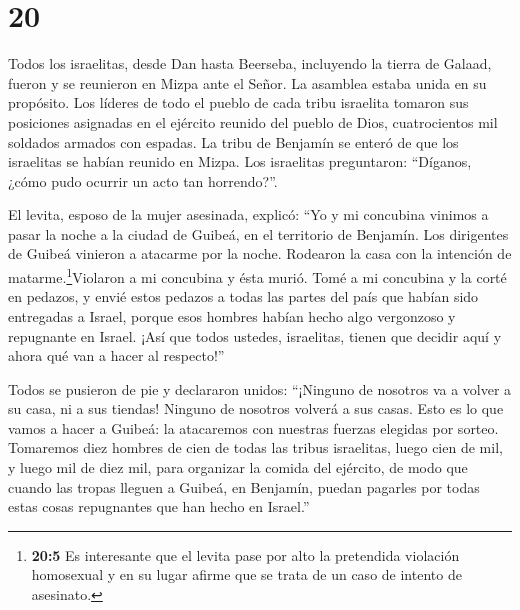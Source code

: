 \hypertarget{section-19}{%
\section{20}\label{section-19}}

 Todos los israelitas, desde Dan hasta Beerseba, incluyendo
la tierra de Galaad, fueron y se reunieron en Mizpa ante el Señor. La
asamblea estaba unida en su propósito.  Los líderes de todo
el pueblo de cada tribu israelita tomaron sus posiciones asignadas en el
ejército reunido del pueblo de Dios, cuatrocientos mil soldados armados
con espadas.  La tribu de Benjamín se enteró de que los
israelitas se habían reunido en Mizpa. Los israelitas preguntaron:
``Díganos, ¿cómo pudo ocurrir un acto tan horrendo?''.

 El levita, esposo de la mujer asesinada, explicó: ``Yo y mi
concubina vinimos a pasar la noche a la ciudad de Guibeá, en el
territorio de Benjamín.  Los dirigentes de Guibeá vinieron a
atacarme por la noche. Rodearon la casa con la intención de
matarme.\footnote{\textbf{20:5} Es interesante que el levita pase por
  alto la pretendida violación homosexual y en su lugar afirme que se
  trata de un caso de intento de asesinato.}Violaron a mi concubina y
ésta murió.  Tomé a mi concubina y la corté en pedazos, y
envié estos pedazos a todas las partes del país que habían sido
entregadas a Israel, porque esos hombres habían hecho algo vergonzoso y
repugnante en Israel.  ¡Así que todos ustedes, israelitas,
tienen que decidir aquí y ahora qué van a hacer al respecto!''

 Todos se pusieron de pie y declararon unidos: ``¡Ninguno de
nosotros va a volver a su casa, ni a sus tiendas! Ninguno de nosotros
volverá a sus casas.  Esto es lo que vamos a hacer a Guibeá:
la atacaremos con nuestras fuerzas elegidas por sorteo. 
Tomaremos diez hombres de cien de todas las tribus israelitas, luego
cien de mil, y luego mil de diez mil, para organizar la comida del
ejército, de modo que cuando las tropas lleguen a Guibeá, en Benjamín,
puedan pagarles por todas estas cosas repugnantes que han hecho en
Israel.''

